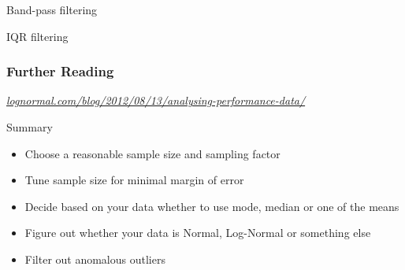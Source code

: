 \documentclass{beamer}
\newcommand{\innersplash}[1]{
  \begin{center}
    \Large \textrm{\textit{ #1 } }
  \end{center}
}
\newcommand{\splashslide}[2][{}]{
  \begin{frame}
  \frametitle{#1}
  \innersplash{#2}
  \end{frame}
}
\begin{document}
\begin{frame}{Band-pass filtering}
\end{frame} 

\begin{frame}{IQR filtering}
\end{frame}

\splashslide[Further Reading]{\href{http://www.lognormal.com/blog/2012/08/13/analysing-performance-data/}{lognormal.com/blog/2012/08/13/analysing-performance-data/}}

\begin{frame}{Summary}
  \begin{itemize}
  \item Choose a reasonable sample size and sampling factor
  \item Tune sample size for minimal margin of error
  \item Decide based on your data whether to use mode, median or one of the means
  \item Figure out whether your data is Normal, Log-Normal or something else
  \item Filter out anomalous outliers
  \end{itemize}
\end{frame}
\end{document}
